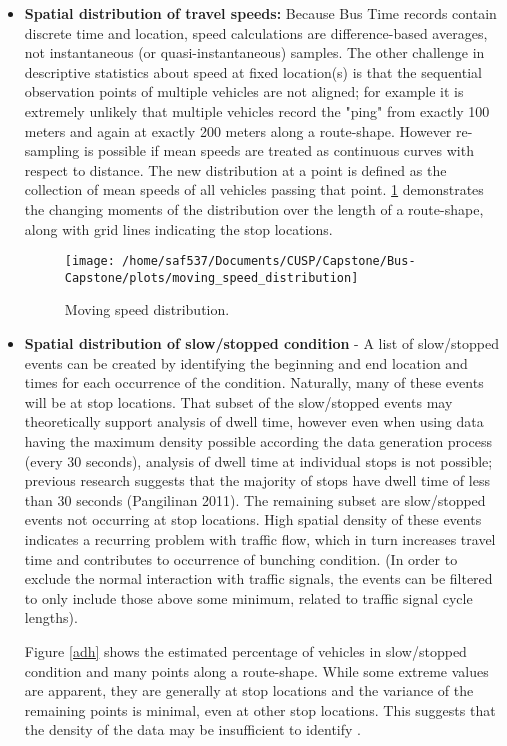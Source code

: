 \documentclass[12pt]{report}
\begin{document}
\begin{itemize}
\item \textbf{Spatial distribution of travel speeds:} Because Bus Time records contain discrete time and location, speed calculations are difference-based averages, not instantaneous (or quasi-instantaneous) samples.  The other challenge in descriptive statistics about speed at fixed location(s) is that the sequential observation points of multiple vehicles are not aligned; for example it is extremely unlikely that multiple vehicles record the "ping" from exactly 100 meters and again at exactly 200 meters along a route-shape.  However re-sampling is possible if mean speeds are treated as continuous curves with respect to distance.  The new distribution at a point is defined as the collection of mean speeds of all vehicles passing that point.  \ref{msd} demonstrates the changing moments of the distribution over the length of a route-shape, along with grid lines indicating the stop locations.

\begin{center}
\begin{figure}[!ht]
  \caption{Moving speed distribution.}
  \label{msd}
  \centering
    \texttt{[image: /home/saf537/Documents/CUSP/Capstone/Bus-Capstone/plots/moving\_speed\_distribution]}
\end{figure}
\end{center}

\item \textbf{Spatial distribution of slow/stopped condition} - A list of slow/stopped events can be created by identifying the beginning and end location and times for each occurrence of the condition.  Naturally, many of these events will be at stop locations.   That subset of the slow/stopped events may theoretically support analysis of dwell time, however even when using data having the maximum density possible according the data generation process (every 30 seconds), analysis of dwell time at individual stops is not possible; previous research suggests that the majority of stops have dwell time of less than 30 seconds (Pangilinan 2011).  The remaining subset are slow/stopped events not occurring at stop locations.  High spatial density of these events indicates a recurring problem with traffic flow, which in turn increases travel time and contributes to occurrence of bunching condition.  (In order to exclude the normal interaction with traffic signals, the events can be filtered to only include those above some minimum, related to traffic signal cycle lengths).

Figure \ref{adh} shows the estimated percentage of vehicles in slow/stopped condition and many points along a route-shape.  While some extreme values are apparent, they are generally at stop locations and the variance of the remaining points is minimal, even at other stop locations.  This suggests that the density of the data may be insufficient to identify .




\end{itemize}
\end{document}
